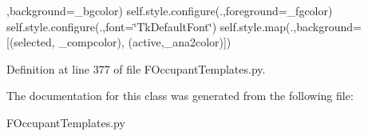 \textquotesingle{},background=\+\_\+bgcolor) self.\+style.\+configure(\textquotesingle{}.\textquotesingle{},foreground=\+\_\+fgcolor) self.\+style.\+configure(\textquotesingle{}.\textquotesingle{},font=\char`\"{}\+Tk\+Default\+Font\char`\"{}) self.\+style.\+map(\textquotesingle{}.\textquotesingle{},background= \mbox{[}(\textquotesingle{}selected\textquotesingle{}, \+\_\+compcolor), (\textquotesingle{}active\textquotesingle{},\+\_\+ana2color)\mbox{]}) 

Definition at line 377 of file F\+Occupant\+Templates.\+py.



The documentation for this class was generated from the following file\+:\begin{DoxyCompactItemize}
\item 
F\+Occupant\+Templates.\+py\end{DoxyCompactItemize}
